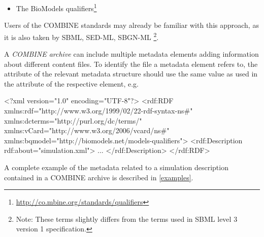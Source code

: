 \begin{itemize}
{	Metadata terms\footnote{\url{http://dublincore.org/documents/dcmi-terms/}} of 
	the Dublin Core Metadata Initiative, in particular the terms: 

	\begin{itemize}
		\item {} (\url{http://purl.org/dc/terms/description}),
		\item {} (\url{http://purl.org/dc/terms/creator}), 
		\item {} (\url{http://purl.org/dc/terms/created}), 
		\item {} (\url{http://purl.org/dc/terms/modified}),
		\item {} (\url{http://purl.org/dc/terms/W3CDTF}).
	\end{itemize}
		
	More information on the use of Dublin Core in RDF can be found 
	on the Dublin Core website{\footnote{\url{http://dublincore.org/documents/dc-rdf/}}}. 
	
	More informationabout the definition of the date format used within  and 
	 elements is available on the W3C website {\footnote{\url{http://www.w3.org/TR/NOTE-datetime}}}.
	}
\item {The BioModels qualifiers\footnote{\url{http://co.mbine.org/standards/qualifiers}}
}
\end{itemize}

Users of the COMBINE standards may already be familiar with this 
approach, as it is also taken by SBML, SED-ML, SBGN-ML \footnote{Note: These terms slightly differs
from the terms used in SBML level 3 version 1 specification.}.

A \textit{COMBINE archive} can include multiple metadata elements adding information about different content files. To 
identify the file a metadata element refers to, the  attribute of the relevant metadata structure should use the same value as used in the  attribute of the respective \Content element, e.g.

\begin{example}
<?xml version="1.0" encoding="UTF-8"?>
<rdf:RDF xmlns:rdf="http://www.w3.org/1999/02/22-rdf-syntax-ns#" 
         xmlns:dcterms="http://purl.org/dc/terms/" 
	 xmlns:vCard="http://www.w3.org/2006/vcard/ns#"
	 xmlns:bqmodel="http://biomodels.net/models-qualifiers">
   <rdf:Description rdf:about="simulation.xml">
   ...
	 </rdf:Description>
</rdf:RDF>
\end{example}

A complete example of the metadata related to a simulation description contained in a COMBINE archive is described in \ref{examples}. 


